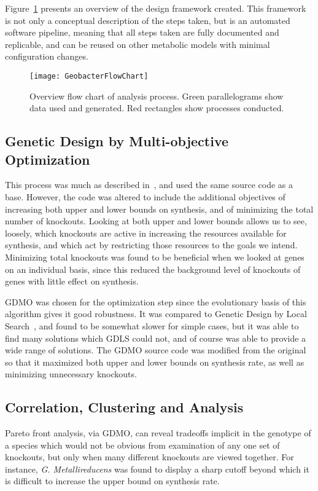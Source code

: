 \documentclass[a4paper]{article}
\begin{document}
Figure~\ref{fig:flowdiagram} presents an overview of the design framework created. This framework is not only a conceptual description of the steps taken, but is an automated software pipeline, meaning that all steps taken are fully documented and replicable, and can be reused on other metabolic models with minimal configuration changes. 

\begin{figure}[!htb]
\texttt{[image: GeobacterFlowChart]}
\caption{Overview flow chart of analysis process. Green parallelograms show data used and generated. Red rectangles show processes conducted.}
\label{fig:flowdiagram}
\end{figure}

\subsection{Genetic Design by Multi-objective Optimization}
This process was much as described in~\cite{Costanza2012}, and used the same source code as a base. However, the code was altered to include the additional objectives of increasing both upper and lower bounds on synthesis, and of minimizing the total number of knockouts. Looking at both upper and lower bounds allows us to see, loosely, which knockouts are active in increasing the resources available for synthesis, and which act by restricting those resources to the goals we intend. Minimizing total knockouts was found to be beneficial when we looked at genes on an individual basis, since this reduced the background level of knockouts of genes with little effect on synthesis.

GDMO was chosen for the optimization step since the evolutionary basis of this algorithm gives it good robustness. It was compared to Genetic Design by Local Search~\cite{Lun2009}, and found to be somewhat slower for simple cases, but it was able to find many solutions which GDLS could not, and of course was able to provide a wide range of solutions. The GDMO source code was modified from the original so that it maximized both upper and lower bounds on synthesis rate, as well as minimizing unnecessary knockouts.

\subsection{Correlation, Clustering and Analysis}
Pareto front analysis, via GDMO, can reveal tradeoffs implicit in the genotype of a species which would not be obvious from examination of any one set of knockouts, but only when many different knockouts are viewed together. For instance, {\it G. Metallireducens} was found to display a sharp cutoff beyond which it is difficult to increase the upper bound on synthesis rate.
\end{document}
